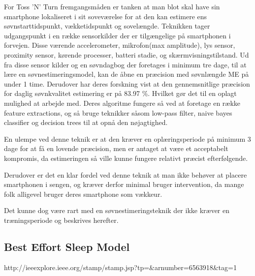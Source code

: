 For Toss 'N' Turn fremgangsmåden er tanken at man blot skal have sin smartphone lokaliseret i sit soveværelse for at den kan estimere ens søvnstarttidspunkt, vækketidspunkt og sovelængde.
Teknikken tager udgangspunkt i en række sensorkilder der er tilgængelige på smartphonen i forvejen.
Disse værende accelerometer, mikrofon(max amplitude), lys sensor, proximity sensor, kørende processer, batteri stadie, og skærmvisningstilstand.
Ud fra disse sensor kilder og en søvndagbog der foretages i minimum tre dage, til at lære en søvnestimeringsmodel, kan de åbne en præcision med søvnlængde ME på under 1 time.
Derudover har deres forskning vist at den gennemsnitlige præcision for daglig søvnkvalitet estimering er på 83.97 \%. Hvilket gør det til en oplagt mulighed at arbejde med.
Deres algoritme fungere så ved at foretage en række feature extractions, og så bruge teknikker såsom low-pass filter, naive bayes classifier og decision trees til at opnå den nøjagtighed.

En ulempe ved denne teknik er at den kræver en oplæringsperiode på minimum 3 dage for at få en lovende præcision, men er antaget at være et acceptabelt kompromis, da estimeringen så ville kunne fungere relativt præcist efterfølgende.

Derudover er det en klar fordel ved denne teknik at man ikke behøver at placere smartphonen i sengen, og kræver derfor minimal bruger intervention, da mange folk alligevel bruger deres smartphone som vækkeur.

Det kunne dog være rart med en søvnestimeringsteknik der ikke kræver en træningsperiode og beskrives herefter.

\subsection{Best Effort Sleep Model}
http://ieeexplore.ieee.org/stamp/stamp.jsp?tp=&arnumber=6563918&tag=1


